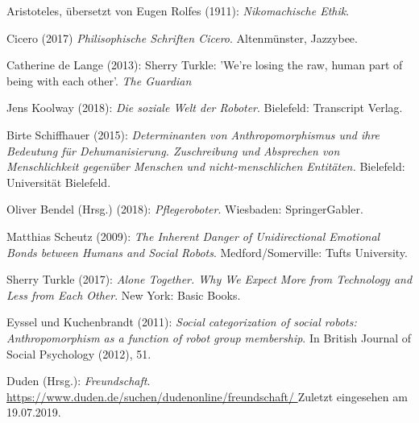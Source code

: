 \documentclass[12pt]{article}
\begin{document}
\newpage
%
%
\begin{thebibliography}{5}
%

Aristoteles, übersetzt von Eugen Rolfes (1911): {\sl Nikomachische Ethik}. 

Cicero (2017) {\sl Philisophische Schriften Cicero}. Altenmünster, Jazzybee.

Catherine de Lange (2013): Sherry Turkle: 'We're losing the raw, human part of being with each other'. {\sl The Guardian}

Jens Koolway (2018): {\sl Die soziale Welt der Roboter}. Bielefeld: Transcript Verlag.

Birte Schiffhauer (2015): {\sl Determinanten von Anthropomorphismus und ihre Bedeutung für Dehumanisierung. Zuschreibung und Absprechen von Menschlichkeit gegenüber Menschen und nicht-menschlichen Entitäten.} Bielefeld: Universität Bielefeld.

Oliver Bendel (Hrsg.) (2018): {\sl Pflegeroboter}. Wiesbaden: SpringerGabler.

Matthias Scheutz (2009): {\sl The Inherent Danger of Unidirectional Emotional Bonds between Humans and Social Robots}. Medford/Somerville: Tufts University.

Sherry Turkle (2017): {\sl Alone Together. Why We Expect More from Technology and Less from Each Other}. New York: Basic Books.

Eyssel und Kuchenbrandt (2011): {\sl Social categorization of social robots: Anthropomorphism as a function of robot group membership}. In British Journal of Social Psychology (2012), 51. 

Duden (Hrsg.): {\sl Freundschaft}. \url{ https://www.duden.de/suchen/dudenonline/freundschaft/ } Zuletzt eingesehen am 19.07.2019.

\end{thebibliography}
\end{document}
